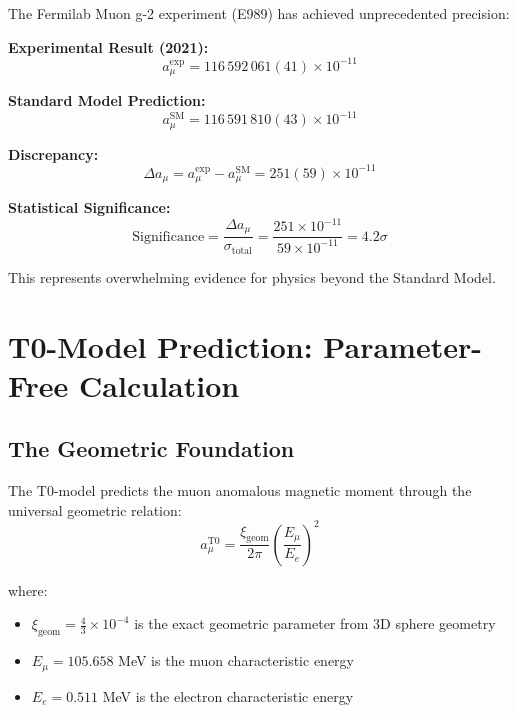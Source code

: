 \documentclass[12pt,a4paper]{report}
\newcommand{\xigeom}{\xi_{\text{geom}}}   %
\newcommand{\Ee}{E_e}                     %
\newcommand{\Emu}{E_\mu}                  %
\begin{document}
	The Fermilab Muon g-2 experiment (E989) has achieved unprecedented precision:
	
	\textbf{Experimental Result (2021):}
	\begin{equation}
		a_\mu^{\text{exp}} = 116\,592\,061(41) \times 10^{-11}
		\label{eq:experimental_value}
	\end{equation}
	
	\textbf{Standard Model Prediction:}
	\begin{equation}
		a_\mu^{\text{SM}} = 116\,591\,810(43) \times 10^{-11}
		\label{eq:sm_prediction}
	\end{equation}
	
	\textbf{Discrepancy:}
	\begin{equation}
		\Delta a_\mu = a_\mu^{\text{exp}} - a_\mu^{\text{SM}} = 251(59) \times 10^{-11}
		\label{eq:discrepancy}
	\end{equation}
	
	\textbf{Statistical Significance:}
	\begin{equation}
		\text{Significance} = \frac{\Delta a_\mu}{\sigma_{\text{total}}} = \frac{251 \times 10^{-11}}{59 \times 10^{-11}} = 4.2\sigma
		\label{eq:significance}
	\end{equation}
	
	This represents overwhelming evidence for physics beyond the Standard Model.
	
	\section{T0-Model Prediction: Parameter-Free Calculation}
	\label{sec:t0_prediction}
	
	\subsection{The Geometric Foundation}
	\label{subsec:geometric_foundation}
	
	The T0-model predicts the muon anomalous magnetic moment through the universal geometric relation:
	\begin{equation}
		a_\mu^{\text{T0}} = \frac{\xigeom}{2\pi} \left(\frac{\Emu}{\Ee}\right)^2
		\label{eq:t0_prediction}
	\end{equation}
	
	where:
	\begin{itemize}
		\item $\xigeom = \frac{4}{3} \times 10^{-4}$ is the exact geometric parameter from 3D sphere geometry
		\item $\Emu = 105.658$ MeV is the muon characteristic energy
		\item $\Ee = 0.511$ MeV is the electron characteristic energy
	\end{itemize}
	
\end{document}
